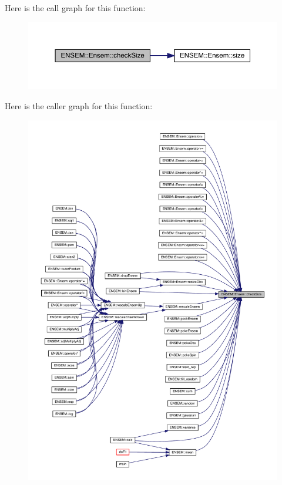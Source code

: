 Here is the call graph for this function\+:
\nopagebreak
\begin{figure}[H]
\begin{center}
\leavevmode
\includegraphics[width=350pt]{d7/d3e/classENSEM_1_1Ensem_a32978c0e251d9731bdb83c6069eb059d_cgraph}
\end{center}
\end{figure}
Here is the caller graph for this function\+:\nopagebreak
\begin{figure}[H]
\begin{center}
\leavevmode
\includegraphics[width=350pt]{d7/d3e/classENSEM_1_1Ensem_a32978c0e251d9731bdb83c6069eb059d_icgraph}
\end{center}
\end{figure}
\mbox{\label{classENSEM_1_1Ensem_a4c06fadea7b637572de2347739b78004}} 

